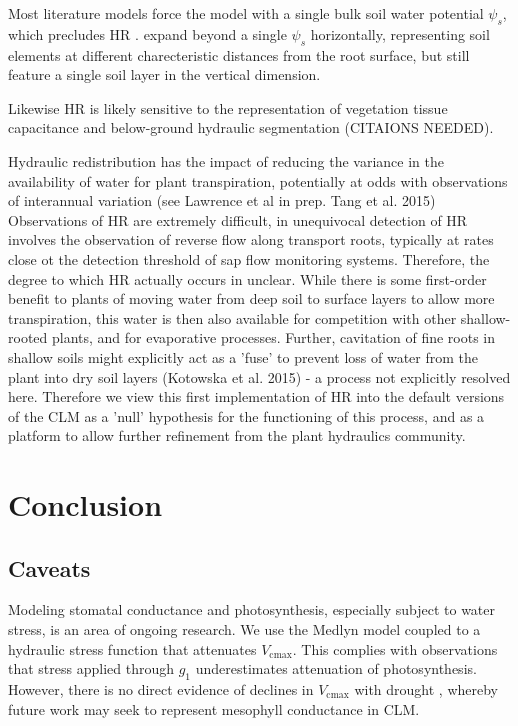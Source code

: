 \documentclass[draft,linenumbers]{agujournal}
\begin{document}
    Most literature models force the model with a single bulk soil water potential $\psi_s$, which precludes HR \citep{fisher2007,bonan2014,sperry2017}. \cite{christoffersen2016} expand beyond a single $\psi_s$ horizontally, representing soil elements at different charecteristic distances from the root surface,  but still feature a single soil layer in the vertical dimension.  
    
    Likewise HR is likely sensitive to the representation of vegetation tissue capacitance and below-ground hydraulic segmentation (CITAIONS NEEDED).
    
    Hydraulic redistribution has the impact of reducing the variance in the availability of water for plant transpiration, potentially at odds with observations of interannual variation (see Lawrence et al in prep. Tang et al. 2015) Observations of HR are extremely difficult, in unequivocal detection of HR involves the observation of reverse flow along transport roots, typically at rates close ot the detection threshold of sap flow monitoring systems. Therefore, the degree to which HR actually occurs in unclear. While there is some first-order benefit to plants of moving water from deep soil to surface layers to allow more transpiration, this water is then also available for competition with other shallow-rooted plants, and for evaporative processes. Further, cavitation of fine roots in shallow soils might explicitly act as a 'fuse' to prevent loss of water from the plant into dry soil layers (Kotowska et al. 2015) - a process not explicitly resolved here. Therefore we view this first implementation of HR into the default versions of the CLM as a 'null' hypothesis for the functioning of this process, and as a platform to allow further refinement from the plant hydraulics community. 
    

\section{Conclusion}

\subsection{Caveats}

    Modeling stomatal conductance and photosynthesis, especially subject to water stress, is an area of ongoing research. We use the Medlyn model coupled to a hydraulic stress function that attenuates $V_{\text{cmax}}$. This complies with observations \citep{lin2018,zhou2013} that stress applied through $g_1$ underestimates attenuation of photosynthesis. However, there is no direct evidence of declines in $V_{\text{cmax}}$ with drought \citep{flexas2006}, whereby future work may seek to represent mesophyll conductance in CLM.
    
\end{document}
